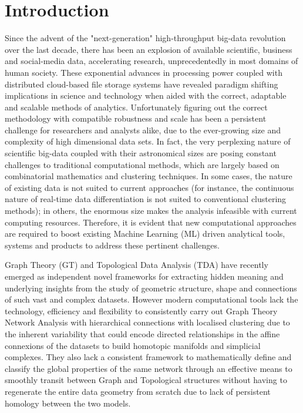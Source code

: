 \section{Introduction}
Since the advent of the "next-generation" high-throughput big-data revolution over the last decade, there has been an explosion of available scientific, business and social-media data, accelerating research, unprecedentedly in most domains of human society. These exponential advances in processing power coupled with distributed cloud-based file storage systems have revealed paradigm shifting implications in science and technology when aided with the correct, adaptable and scalable methods of analytics. Unfortunately figuring out the correct methodology with compatible robustness and scale has been a persistent challenge for researchers and analysts alike, due to the ever-growing size and complexity of high dimensional data sets. In fact, the very perplexing nature of scientific big-data coupled with their astronomical sizes are posing constant challenges to traditional computational methods, which are largely based on combinatorial mathematics and clustering techniques. In some cases, the nature of existing data is not suited to current approaches (for instance, the continuous nature of real-time data differentiation is not suited to conventional clustering methods); in others, the enormous size makes the analysis infeasible with current computing resources. Therefore, it is evident that new computational approaches are required to boost existing Machine Learning (ML) driven analytical tools, systems and products to address these pertinent challenges.

Graph Theory (GT) and Topological Data Analysis (TDA) have recently emerged as independent novel frameworks for extracting hidden meaning and underlying insights from the study of geometric structure, shape and connections of such vast and complex datasets. However modern computational tools lack the technology, efficiency and flexibility to consistently carry out Graph Theory Network Analysis with hierarchical connections with localised clustering due to the inherent variability that could encode directed relationships in the affine connexions of the datasets to build homotopic manifolds and simplicial complexes. They also lack a consistent framework to mathematically define and classify the global properties of the same network through an effective means to smoothly transit between Graph and Topological structures without having to regenerate the entire data geometry from scratch due to lack of persistent homology between the two models. 

